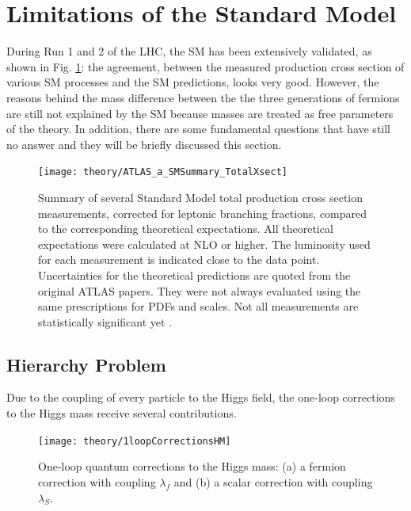 	\section{Limitations of the Standard Model}
	\label{sec:SMlim}

		During Run 1 and 2 of the LHC, the SM has been extensively validated, as shown in Fig. \ref{fig:ATLAS_a_SMSummary_TotalXsect}: the agreement, between the measured production cross section of various SM processes and the SM predictions, looks very good. However, the reasons behind the mass difference between the the three generations of fermions are still not explained by the SM because masses are treated as free parameters of the theory. In addition, there are some fundamental questions that have still no answer and they will be briefly discussed this section.

		\begin{figure}[!htb]
			\centering
			\texttt{[image: theory/ATLAS\_a\_SMSummary\_TotalXsect]}
			\caption{\label{fig:ATLAS_a_SMSummary_TotalXsect} Summary of several Standard Model total production cross section measurements, corrected for leptonic branching fractions, compared to the corresponding theoretical expectations. All theoretical expectations were calculated at NLO or higher. The luminosity used for each measurement is indicated close to the data point. Uncertainties for the theoretical predictions are quoted from the original ATLAS papers. They were not always evaluated using the same prescriptions for PDFs and scales. Not all measurements are statistically significant yet \cite{ATLAS_a_SMSummary_TotalXsect}.}
		\end{figure}



		\subsection*{Hierarchy Problem}

			Due to the coupling of every particle to the Higgs field, the one-loop corrections to the Higgs mass receive several contributions. 

			\begin{figure}
				\centering
				\texttt{[image: theory/1loopCorrectionsHM]}
				\caption{\label{fig:higgs_coupling} One-loop quantum corrections to the Higgs mass: (a) a fermion correction with coupling $\lambda_f$ and (b) a scalar correction with coupling $\lambda_S$.}
			\end{figure}

